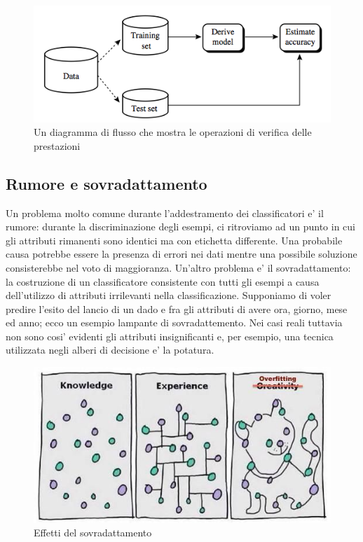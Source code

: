 \begin{figure}[H]
	\centering
	\includegraphics[width=0.7\linewidth]{img/training_test_flow}
	\caption{Un diagramma di flusso che mostra le operazioni di verifica delle prestazioni}
	\label{fig:trainingtestflow}
\end{figure}




\subsection{Rumore e sovradattamento}
Un problema molto comune durante l'addestramento dei classificatori e' il rumore: durante la discriminazione degli esempi, ci ritroviamo ad un punto in cui gli attributi rimanenti sono identici ma con etichetta differente. Una probabile causa potrebbe essere la presenza di errori nei dati mentre una possibile soluzione consisterebbe nel voto di maggioranza.
Un'altro problema e' il sovradattamento: la costruzione di un classificatore consistente con tutti gli esempi a causa dell'utilizzo di attributi irrilevanti nella classificazione. Supponiamo di voler predire l'esito del lancio di un dado e fra gli attributi di avere ora, giorno, mese ed anno; ecco un esempio lampante di sovradattemento. Nei casi reali tuttavia non sono cosi' evidenti gli attributi insignificanti e, per esempio, una tecnica utilizzata  negli alberi di decisione e' la potatura.

\begin{figure}[H]
	\centering
	\includegraphics[width=0.7\linewidth]{img/overfitting}
	\caption{Effetti del sovradattamento}
	\label{fig:overfitting}
\end{figure}

